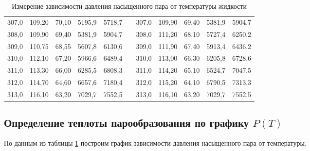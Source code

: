 \documentclass[a4paper,12pt]{article} %
\begin{document}
\begin{table}[H]
\begin{tabular}{|c|c|c|c|c|c|c|c|c|c|c|}
		307,0 & 109,20 & 70,10 & 5195,9 & 5718,7 &  & 307,0 & 109,90 & 69,40 & 5381,9 & 5904,7 \\ \cline{1-5} \cline{7-11} 
		308,0 & 109,90 & 69,40 & 5381,9 & 5904,7 &  & 308,0 & 111,20 & 68,10 & 5727,4 & 6250,2 \\ \cline{1-5} \cline{7-11} 
		309,0 & 110,75 & 68,55 & 5607,8 & 6130,6 &  & 309,0 & 111,90 & 67,40 & 5913,4 & 6436,2 \\ \cline{1-5} \cline{7-11} 
		310,0 & 112,10 & 67,20 & 5966,6 & 6489,4 &  & 310,0 & 113,00 & 66,30 & 6205,8 & 6728,6 \\ \cline{1-5} \cline{7-11} 
		311,0 & 113,30 & 66,00 & 6285,5 & 6808,3 &  & 311,0 & 114,20 & 65,10 & 6524,7 & 7047,5 \\ \cline{1-5} \cline{7-11} 
		312,0 & 114,70 & 64,60 & 6657,6 & 7180,4 &  & 312,0 & 115,20 & 64,10 & 6790,5 & 7313,3 \\ \cline{1-5} \cline{7-11} 
		313,0 & 116,10 & 63,20 & 7029,7 & 7552,5 &  & 313,0 & 116,10 & 63,20 & 7029,7 & 7552,5 \\ \cline{1-5} \cline{7-11} 
	\end{tabular}
	\caption{Измерение зависимости давления насыщенного пара от температуры жидкости}
	\label{tab:measures}
\end{table}

\subsection{Определение теплоты парообразования по графику $ P(T) $}

По данным из таблицы \ref{tab:measures} построим график зависимости давления насыщенного пара от температуры.
\end{document}
